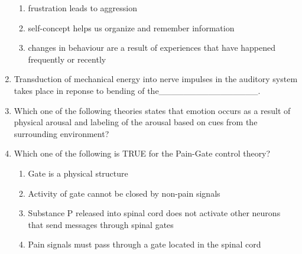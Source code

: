 \documentclass[12pt]{article}
\theoremstyle{remark}
\begin{document}
\begin{enumerate}
\begin{enumerate}
    \item frustration leads to aggression
    \item self-concept helps us organize and remember information
    \item changes in behaviour are a result of experiences that have happened frequently or recently
\end{enumerate}
\hfill{}
\item Transduction of mechanical energy into nerve impulses in the auditory system takes place in reponse to bending of the\_\_\_\_\_\_\_\_\_\_\_\_\_\_\_\_.
\begin{enumerate}
\end{enumerate}
\hfill{}
\item Which one of the following theories states that emotion occurs as a result of physical arousal and labeling of the arousal based on cues from the surrounding environment?
\begin{enumerate}
\end{enumerate}
\hfill{}
\item Which one of the following is TRUE for the Pain-Gate control theory?
\begin{enumerate}
    \item Gate is a physical structure
    \item Activity of gate cannot be closed by non-pain signals
    \item Substance P released into spinal cord does not activate other neurons that send messages through spinal gates
    \item Pain signals must pass through a gate located in the spinal cord
\end{enumerate}

\end{enumerate}
\end{document}
